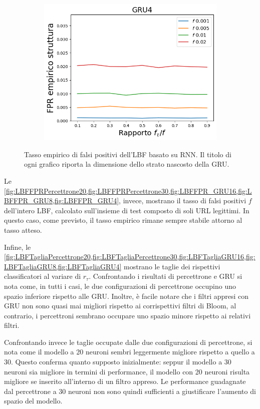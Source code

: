 \documentclass[../../main.tex]{subfiles}
\begin{document}
\begin{figure}[H]
        \begin{subfigure}[b]{0.49\textwidth}
            \centering
            \includegraphics[width = \textwidth]{immagini/7/LBF/GRU4_FPR.png}
            \caption{}
            \label{fig:LBFFPR_GRU4}
        \end{subfigure}
        \caption{Tasso empirico di falsi positivi dell'LBF basato su RNN. Il titolo di ogni grafico riporta la dimensione dello strato nascosto della GRU.}
        \label{fig:GRU_LBFFPR}
    \end{figure}

    Le \cref{fig:LBFFPRPercettrone20,fig:LBFFPRPercettrone30,fig:LBFFPR_GRU16,fig:LBFFPR_GRU8,fig:LBFFPR_GRU4}, invece, mostrano il tasso di falsi positivi $f$ dell'intero LBF, calcolato sull'insieme di test composto di soli URL legittimi. In questo caso, come previsto, il tasso empirico rimane sempre stabile attorno al tasso atteso.

    Infine, le \cref{fig:LBFTagliaPercettrone20,fig:LBFTagliaPercettrone30,fig:LBFTagliaGRU16,fig:LBFTagliaGRU8,fig:LBFTagliaGRU4} mostrano le taglie dei rispettivi classificatori al variare di $r_{\tau}$. Confrontando i risultati di percettrone e GRU si nota come, in tutti i casi, le due configurazioni di percettrone occupino uno spazio inferiore rispetto alle GRU. Inoltre, è facile notare che i filtri appresi con GRU non sono quasi mai migliori rispetto ai corrispettivi filtri di Bloom, al contrario, i percettroni sembrano occupare uno spazio minore rispetto ai relativi filtri. 

    Confrontando invece le taglie occupate dalle due configurazioni di percettrone, si nota come il modello a 20 neuroni sembri leggermente migliore rispetto a quello a 30. Questo conferma quanto supposto inizialmente: seppur il modello a 30 neuroni sia migliore in termini di performance, il modello con 20 neuroni risulta migliore se inserito all'interno di un filtro appreso. Le performance guadagnate dal percettrone a 30 neuroni non sono quindi sufficienti a giustificare l'aumento di spazio del modello.
\end{document}
